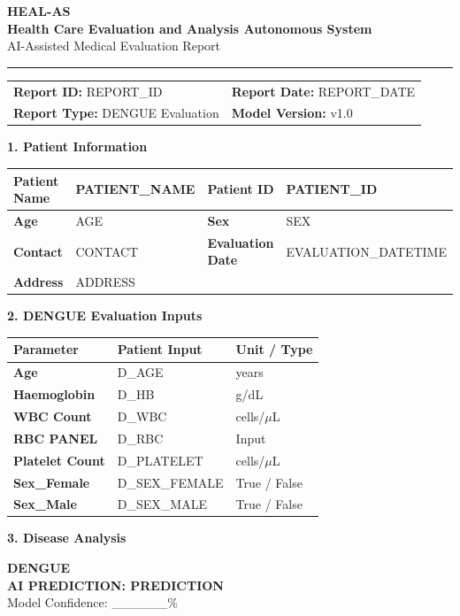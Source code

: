 \documentclass[11pt,a4paper]{article}
\newcommand{\sectiontitle}[1]{\vspace{8pt}\noindent\colorbox{HealBlue}{\parbox{\dimexpr\linewidth-2\fboxsep}{\color{white}\textbf{\large #1}}}\vspace{5pt}}
\begin{document}
\begin{center}
{\Huge\textbf{\color{HealBlue}HEAL-AS}}\\[3pt]
{\large\textbf{Health Care Evaluation and Analysis Autonomous System}}\\[3pt]
{\small AI-Assisted Medical Evaluation Report}\\[6pt]
\rule{\linewidth}{1pt}
\end{center}
\begin{tabularx}{\linewidth}{X X}
\textbf{Report ID:} {{REPORT_ID}} & \textbf{Report Date:} {{REPORT_DATE}}\\
\textbf{Report Type:} DENGUE Evaluation & \textbf{Model Version:} v1.0
\end{tabularx}

\sectiontitle{1. Patient Information}
\begin{tabularx}{\linewidth}{|l|X|l|X|}
\hline
\textbf{Patient Name} & {{PATIENT_NAME}} & \textbf{Patient ID} & {{PATIENT_ID}} \\ \hline
\textbf{Age} & {{AGE}} & \textbf{Sex} & {{SEX}} \\ \hline
\textbf{Contact} & {{CONTACT}} & \textbf{Evaluation Date} & {{EVALUATION_DATETIME}} \\ \hline
\textbf{Address} & \multicolumn{3}{l|}{{ADDRESS}} \\ \hline
\end{tabularx}

\sectiontitle{2. DENGUE Evaluation Inputs}
\begin{tabularx}{\linewidth}{|X|X|X|}
\hline
\textbf{Parameter} & \textbf{Patient Input} & \textbf{Unit / Type}\\ \hline
\textbf{Age} & {{D_AGE}} & years\\ \hline
\textbf{Haemoglobin} & {{D_HB}} & g/dL\\ \hline
\textbf{WBC Count} & {{D_WBC}} & cells/$\mu$L\\ \hline
\textbf{RBC PANEL} & {{D_RBC}} & Input\\ \hline
\textbf{Platelet Count} & {{D_PLATELET}} & cells/$\mu$L\\ \hline
\textbf{Sex\_Female} & {{D_SEX_FEMALE}} & True / False\\ \hline
\textbf{Sex\_Male} & {{D_SEX_MALE}} & True / False\\ \hline
\end{tabularx}

\sectiontitle{3. Disease Analysis}
\begin{tcolorbox}[colback=HealLight,colframe=HealBlue,halign=center]
{\Large\textbf{DENGUE}}\\[6pt]
{\Large\textbf{AI PREDICTION: {{PREDICTION}}}}\\[5pt]
Model Confidence: \_\_\_\_\_\_\%
\end{tcolorbox}
\end{document}
